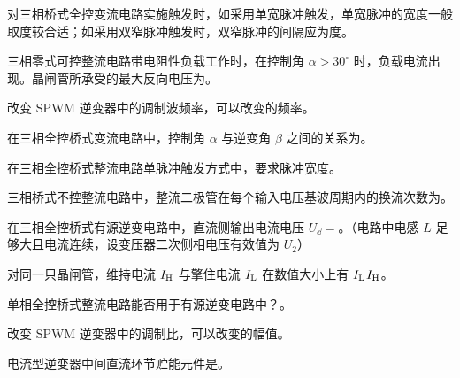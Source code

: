 \documentclass[电力电子]{subfiles}
\begin{document}
\begin{ti}
	对三相桥式全控变流电路实施触发时，如采用单宽脉冲触发，单宽脉冲的宽度一般取度较合适；如采用双窄脉冲触发时，双窄脉冲的间隔应为度。
\end{ti}

\begin{ti}
	三相零式可控整流电路带电阻性负载工作时，在控制角 $\alpha > 30^\circ$ 时，负载电流出现。晶闸管所承受的最大反向电压为。
\end{ti}

\begin{ti}
	改变 SPWM 逆变器中的调制波频率，可以改变的频率。
\end{ti}

\begin{ti}
	在三相全控桥式变流电路中，控制角 $\alpha$ 与逆变角 $\beta$ 之间的关系为。
\end{ti}

\begin{ti}
	在三相全控桥式整流电路单脉冲触发方式中，要求脉冲宽度。
\end{ti}

\begin{ti}
	三相桥式不控整流电路中，整流二极管在每个输入电压基波周期内的换流次数为。
\end{ti}

\begin{ti}
	在三相全控桥式有源逆变电路中，直流侧输出电流电压 $U_{\dd} = $。（电路中电感 $L$ 足够大且电流连续，设变压器二次侧相电压有效值为 $U_{2}$）
\end{ti}

\begin{ti}
	对同一只晶闸管，维持电流 $I_{\mathrm{H}}$ 与擎住电流 $I_{\mathrm{L}}$ 在数值大小上有 $I_{\mathrm{L}}$$I_{\mathrm{H}}$。
\end{ti}

\begin{ti}
	单相全控桥式整流电路能否用于有源逆变电路中？。
\end{ti}

\begin{ti}
	改变 SPWM 逆变器中的调制比，可以改变的幅值。
\end{ti}

\begin{ti}
	电流型逆变器中间直流环节贮能元件是。
\end{ti}
\end{document}
